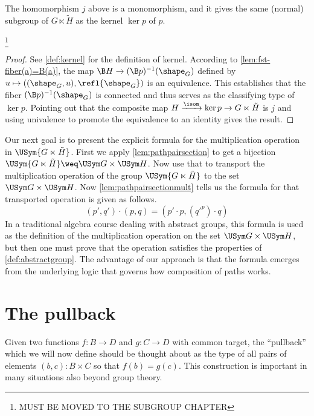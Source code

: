 \begin{lemma}
  The homomorphism $j$ above is a monomorphism, and it gives the same (normal) subgroup of $G \ltimes \tilde H$ as the kernel $\ker p$ of $p$.
\end{lemma}
\footnote{{\color{red}MUST BE MOVED TO THE SUBGROUP CHAPTER}}

\begin{proof}
  See \ref{def:kernel} for the definition of kernel.  According to \cref{lem:fst-fiber(a)=B(a)}, the map $\B H \to (\B p)^{-1}(\shape_G)$ defined by
  $ u \mapsto ((\shape_G,u), \refl{\shape_G}) $ is an equivalence.  This establishes that the fiber $(\B p)^{-1}(\shape_G)$ is connected and thus serves as
  the classifying type of $\ker p$.  Pointing out that the composite map $H \xrightarrow{\isom} \ker p \to G \ltimes \tilde H$ is $j$ and using
  univalence to promote the equivalence to an identity gives the result.
\end{proof}

Our next goal is to present the explicit formula for the multiplication operation in $\USym { G \ltimes \tilde H }$.
First we apply \cref{lem:pathpairsection} to get a bijection $\USym { G \ltimes \tilde H } \weq \USym G \times \USym H$.
Now use that to transport the multiplication operation of the group $\USym { G \ltimes \tilde H }$ to the set $\USym G \times \USym H$.
Now \cref{lem:pathpairsectionmult} tells us the formula for that transported operation is given as follows.
$$ (p',q') \cdot (p,q) = (p' \cdot p , ({q'} ^ p) \cdot q) $$
In a traditional algebra course dealing with abstract groups, this formula is used as the definition of the multiplication operation
on the set $\USym G \times \USym H$, but then one must prove that the operation satisfies the properties of \cref{def:abstractgroup}.
The advantage of our approach is that the formula emerges from the underlying logic that governs how composition of paths works.


\section{The pullback}
\label{sec:pullback}
Given two functions $f:B\to D$ and $g:C\to D$ with common target, the ``pullback'' which we will now define should be thought about as the type of all pairs of elements $(b,c):B\times C$ so that $f(b)=g(c)$.  This construction is important in many situations also beyond group theory.

